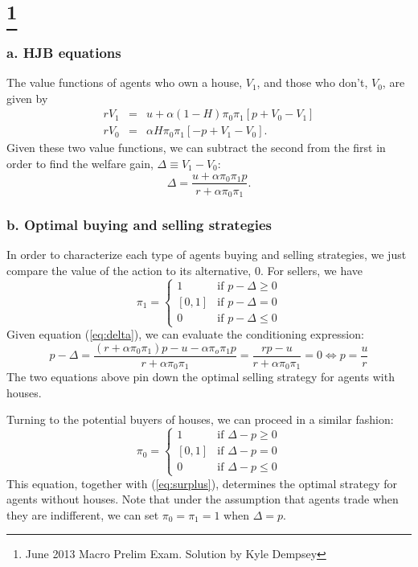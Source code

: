 \documentclass{article}
\begin{document}
\section[]{\footnote{June 2013 Macro Prelim Exam. Solution by Kyle Dempsey}}


\subsubsection*{a. HJB equations}

The value functions of agents who own a house, $V_{1}$, and those
who don't, $V_{0}$, are given by
\begin{eqnarray}
rV_{1} & = & u+\alpha(1-H)\pi_{0}\pi_{1}[p+V_{0}-V_{1}]\\
rV_{0} & = & \alpha H\pi_{0}\pi_{1}[-p+V_{1}-V_{0}].
\end{eqnarray}
Given these two value functions, we can subtract the second from the
first in order to find the welfare gain, $\Delta\equiv V_{1}-V_{0}$:
\begin{equation}
\Delta=\frac{u+\alpha\pi_{0}\pi_{1}p}{r+\alpha\pi_{0}\pi_{1}}.\label{eq:delta}
\end{equation}



\subsubsection*{b. Optimal buying and selling strategies}

In order to characterize each type of agents buying and selling strategies,
we just compare the value of the action to its alternative, 0. For
sellers, we have
\begin{equation}
\pi_{1}=\begin{cases}
1 & \mbox{if }p-\Delta\ge0\\{}
[0,1] & \mbox{if }p-\Delta=0\\
0 & \mbox{if }p-\Delta\le0
\end{cases}
\end{equation}
Given equation (\ref{eq:delta}), we can evaluate the conditioning
expression:
\begin{equation}
p-\Delta=\frac{(r+\alpha\pi_{0}\pi_{1})p-u-\alpha\pi_{o}\pi_{1}p}{r+\alpha\pi_{0}\pi_{1}}=\frac{rp-u}{r+\alpha\pi_{0}\pi_{1}}=0\iff p=\frac{u}{r}\label{eq:surplus}
\end{equation}
The two equations above pin down the optimal selling strategy for
agents with houses.

Turning to the potential buyers of houses, we can proceed in a similar
fashion:
\begin{equation}
\pi_{0}=\begin{cases}
1 & \mbox{if }\Delta-p\ge0\\{}
[0,1] & \mbox{if }\Delta-p=0\\
0 & \mbox{if }\Delta-p\le0
\end{cases}
\end{equation}
This equation, together with (\ref{eq:surplus}), determines the optimal
strategy for agents without houses. Note that under the assumption
that agents trade when they are indifferent, we can set $\pi_{0}=\pi_{1}=1$
when $\Delta=p$.
\end{document}
